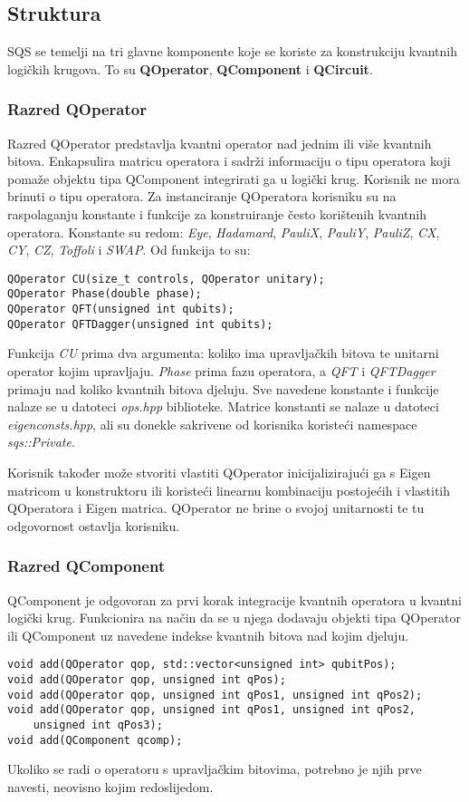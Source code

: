 \subsection{Struktura}

SQS se temelji na tri glavne komponente koje se koriste za konstrukciju kvantnih logičkih krugova. To su \textbf{QOperator}, \textbf{QComponent} i \textbf{QCircuit}.

\subsubsection{Razred QOperator}
Razred QOperator predstavlja kvantni operator nad jednim ili više kvantnih bitova. Enkapsulira matricu operatora i sadrži informaciju o tipu operatora koji pomaže objektu tipa QComponent integrirati ga u logički krug. Korisnik ne mora brinuti o tipu operatora. Za instanciranje QOperatora korisniku su na raspolaganju konstante i funkcije za konstruiranje često korištenih kvantnih operatora. Konstante su redom: \textit{Eye}, \textit{Hadamard}, \textit{PauliX}, \textit{PauliY}, \textit{PauliZ}, \textit{CX}, \textit{CY}, \textit{CZ}, \textit{Toffoli} i \textit{SWAP}. Od funkcija to su:
\lstset{language=c++, tabsize=4, style=mystyle}
\begin{lstlisting}
QOperator CU(size_t controls, QOperator unitary);
QOperator Phase(double phase);
QOperator QFT(unsigned int qubits);
QOperator QFTDagger(unsigned int qubits);
\end{lstlisting}
Funkcija \textit{CU} prima dva argumenta: koliko ima upravljačkih bitova te unitarni operator kojim upravljaju. \textit{Phase} prima fazu operatora, a \textit{QFT} i \textit{QFTDagger} primaju nad koliko kvantnih bitova djeluju. Sve navedene konstante i funkcije nalaze se u datoteci \emph{ops.hpp} biblioteke. Matrice konstanti se nalaze u datoteci \emph{eigenconsts.hpp}, ali su donekle sakrivene od korisnika koristeći namespace \emph{sqs::Private}.

Korisnik također može stvoriti vlastiti QOperator inicijalizirajući ga s Eigen matricom u konstruktoru ili koristeći linearnu kombinaciju postojećih i vlastitih QOperatora i Eigen matrica. QOperator ne brine o svojoj unitarnosti te tu odgovornost ostavlja korisniku.

\subsubsection{Razred QComponent}

QComponent je odgovoran za prvi korak integracije kvantnih operatora u kvantni logički krug. Funkcionira na način da se u njega dodavaju objekti tipa QOperator ili QComponent uz navedene indekse kvantnih bitova nad kojim djeluju.
\begin{lstlisting}
void add(QOperator qop, std::vector<unsigned int> qubitPos);
void add(QOperator qop, unsigned int qPos);
void add(QOperator qop, unsigned int qPos1, unsigned int qPos2);
void add(QOperator qop, unsigned int qPos1, unsigned int qPos2,
	unsigned int qPos3);
void add(QComponent qcomp);
\end{lstlisting}
Ukoliko se radi o operatoru s upravljačkim bitovima, potrebno je njih prve navesti, neovisno kojim redoslijedom.


